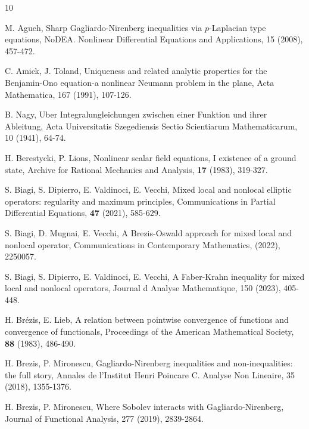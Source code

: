 \documentclass[12pt,a4paper,reqno]{amsart}
\numberwithin{equation}{section}
\begin{document}
\small
\begin{thebibliography}{10}


M. Agueh,
Sharp Gagliardo-Nirenberg inequalities via $p$-Laplacian type equations, NoDEA. Nonlinear Differential Equations and Applications, 15 (2008), 457-472.


C. Amick, J. Toland,  Uniqueness and related analytic properties for the Benjamin-Ono equation-a nonlinear Neumann problem in the plane, Acta Mathematica, 167 (1991), 107-126.


B. Nagy, Uber Integralungleichungen zwischen einer Funktion und ihrer Ableitung,
Acta Universitatis Szegediensis Sectio Scientiarum Mathematicarum,
10 (1941), 64-74.

H. Berestycki, P. Lions,
Nonlinear scalar field equations, I
existence of a ground state,
Archive for Rational Mechanics and Analysis,
\textbf{17}
(1983), 319-327.



S. Biagi, S. Dipierro, E. Valdinoci, E. Vecchi,
Mixed local and nonlocal elliptic operators: regularity and maximum principles,
Communications in Partial Differential Equations,
\textbf{47} (2021), 585-629.


S. Biagi, D. Mugnai, E. Vecchi, A Brezis-Oswald approach for mixed local and nonlocal operator, Communications in Contemporary Mathematics, (2022), 2250057.


S. Biagi, S. Dipierro,  E. Valdinoci, E. Vecchi,
A Faber-Krahn inequality for mixed local and nonlocal operators, Journal d Analyse Mathematique, 150 (2023), 405-448.


H. Br\'{e}zis, E. Lieb,
A relation between pointwise convergence of functions and convergence of functionals,
Proceedings of the American Mathematical Society,
\textbf{88} (1983), 486-490.



H. Brezis, P. Mironescu,
Gagliardo-Nirenberg inequalities and non-inequalities: the full story,
Annales de l'Institut Henri Poincare C. Analyse Non Lineaire,
35 (2018), 1355-1376.

H. Brezis, P. Mironescu,
Where Sobolev interacts with Gagliardo-Nirenberg,
Journal of Functional Analysis,
277 (2019), 2839-2864.



\end{thebibliography}
\end{document}
